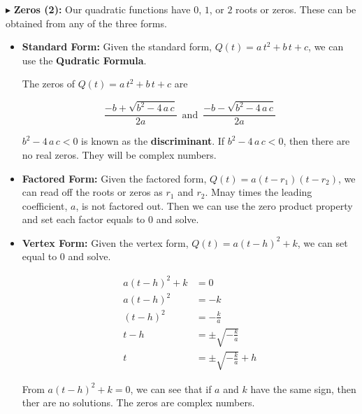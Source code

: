 \documentclass{ximera}
\begin{document}
$\blacktriangleright$ \textbf{Zeros (2):}  Our quadratic functions have $0$, $1$, or $2$ roots or zeros.  These can be obtained from any of the three forms.


\begin{itemize}

\item \textbf{Standard Form:}  Given the standard form, $Q(t) = a \, t^2 + b \, t + c$, we can use the \textbf{Qudratic Formula}.

The zeros of $Q(t) = a \, t^2 + b \, t + c$ are

\[   \frac{-b + \sqrt{b^2 - 4 \, a \, c}}{2a}     \, \text{ and } \,       \frac{-b - \sqrt{b^2 - 4 \, a \, c}}{2a}    \]



$b^2 - 4 \, a \, c < 0$ is known as the \textbf{discriminant}. If $b^2 - 4 \, a \, c < 0$, then there are no real zeros.  They will be complex numbers.


\item \textbf{Factored Form:} Given the factored form, $Q(t) = a (t - r_1)(t - r_2)$, we can read off the roots or zeros as $r_1$ and $r_2$. Mnay times the leading coefficient, $a$, is not factored out.  Then we can use the zero product property and set each factor equals to $0$ and solve.






\item \textbf{Vertex Form:}  Given the vertex form, $Q(t) = a (t - h)^2 + k$, we can set equal to $0$ and solve.



\begin{align*}
a (t - h)^2 + k    & = 0  \\
a (t - h)^2        & = -k  \\
(t - h)^2        & = -\frac{k}{a}  \\
t - h        & = \pm \sqrt{-\frac{k}{a}}  \\
t        & = \pm \sqrt{-\frac{k}{a}}  + h
\end{align*}

From $a (t - h)^2 + k  = 0$, we can see that if $a$ and $k$ have the same sign, then ther are no solutions.  The zeros are complex numbers.



\end{itemize}
\end{document}

